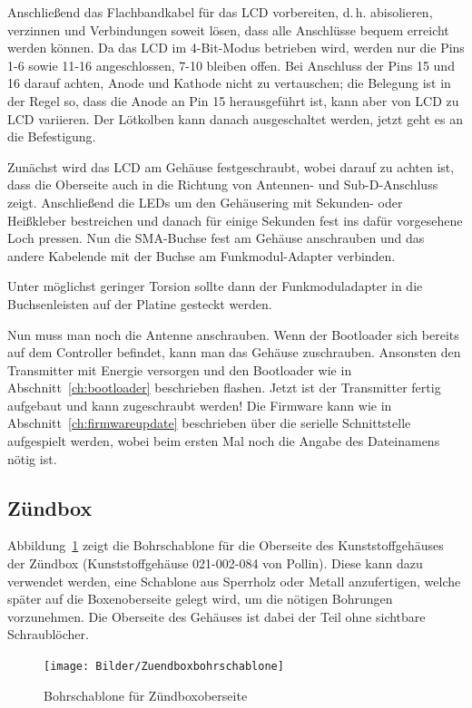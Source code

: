 \documentclass[paper=a4, parskip, numbers=noenddot, toc=listof, headsepline]{scrbook}
\begin{document}
				Anschließend das Flachbandkabel für das LCD vorbereiten, d.\,h. abisolieren, verzinnen und Verbindungen soweit lösen, dass alle Anschlüsse bequem erreicht werden können. Da das LCD im 4-Bit-Modus betrieben wird, werden nur die Pins 1-6 sowie 11-16 angeschlossen, 7-10 bleiben offen. Bei Anschluss der Pins 15 und 16 darauf achten, Anode und Kathode nicht zu vertauschen; die Belegung ist in der Regel so, dass die Anode an Pin 15 herausgeführt ist, kann aber von LCD zu LCD variieren. Der Lötkolben kann danach ausgeschaltet werden, jetzt geht es an die Befestigung.

				Zunächst wird das LCD am Gehäuse festgeschraubt, wobei darauf zu achten ist, dass die Oberseite auch in die Richtung von Antennen- und Sub-D-Anschluss zeigt. Anschließend die LEDs um den Gehäusering mit Sekunden- oder Heißkleber bestreichen und danach für einige Sekunden fest ins dafür vorgesehene Loch pressen. Nun die SMA-Buchse fest am Gehäuse anschrauben und das andere Kabelende mit der Buchse am Funkmodul-Adapter verbinden.

				Unter möglichst geringer Torsion sollte dann der Funkmoduladapter in die Buchsenleisten auf der Platine gesteckt werden.

				Nun muss man noch die Antenne anschrauben. Wenn der Bootloader sich bereits auf dem Controller befindet, kann man das Gehäuse zuschrauben. Ansonsten den Transmitter mit Energie versorgen und den Bootloader wie in Abschnitt~\ref{ch:bootloader} beschrieben flashen. Jetzt ist der Transmitter fertig aufgebaut und kann zugeschraubt werden! Die Firmware kann wie in Abschnitt~\ref{ch:firmwareupdate} beschrieben über die serielle Schnittstelle aufgespielt werden, wobei beim ersten Mal noch die Angabe des Dateinamens nötig ist.

			\subsection{Zündbox}
				Abbildung~\ref{fig:zuendboxbohren} zeigt die Bohrschablone für die Oberseite des Kunststoffgehäuses der Zündbox (Kunststoffgehäuse 021-002-084 von Pollin). Diese kann dazu verwendet werden, eine Schablone aus Sperrholz oder Metall anzufertigen, welche später auf die Boxenoberseite gelegt wird, um die nötigen Bohrungen vorzunehmen. Die Oberseite des Gehäuses ist dabei der Teil ohne sichtbare Schraublöcher.

				\begin{figure}
					\centering
					\texttt{[image: Bilder/Zuendboxbohrschablone]}
					\caption{Bohrschablone für Zündboxoberseite}
					\label{fig:zuendboxbohren}
				\end{figure}
\end{document}
